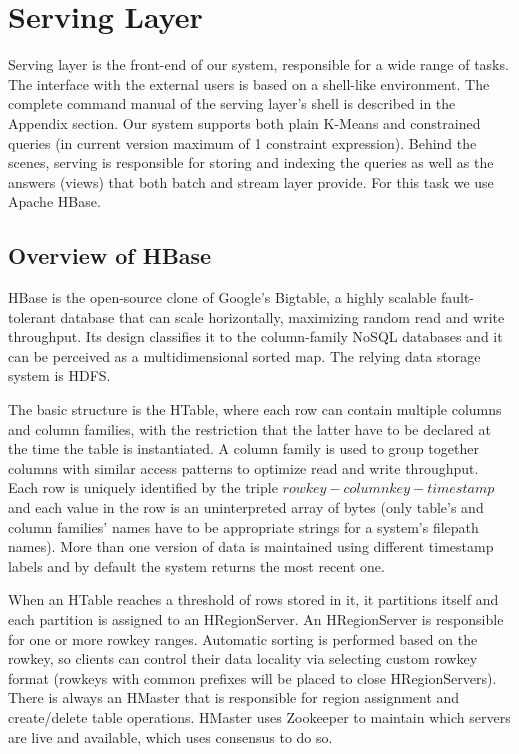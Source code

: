 \documentclass{lmproj}
\begin{document}
\section{Serving Layer}
\label{systemdescr}


Serving layer is the front-end of our system, responsible for a wide range of tasks. The interface with the external users is based on a shell-like environment. The complete command manual of the serving layer's shell is described in the Appendix section. Our system supports both plain K-Means and constrained queries (in current version maximum of 1 constraint expression). Behind the scenes, serving is responsible for storing and indexing the queries as well as the answers (views) that both batch and stream layer provide. For this task we use Apache HBase.

\subsection{Overview of HBase}
HBase is the open-source clone of Google's Bigtable, a highly scalable fault-tolerant database that can scale horizontally, maximizing random read and write throughput. Its design classifies it to the column-family NoSQL databases and it can be perceived as a multidimensional sorted map. The relying data storage system is HDFS.

The basic structure is the HTable, where each row can contain multiple columns and column families, with the restriction that the latter have to be declared at the time the table is instantiated. A column family is used to group together columns with similar access patterns to optimize read and write throughput. Each row is uniquely identified by the triple $row key-column key-timestamp$ and each value in the row is an uninterpreted array of bytes (only table's and column families' names have to be appropriate strings for a system's filepath names). More than one version of data is maintained using different timestamp labels and by default the system returns the most recent one.

When an HTable reaches a threshold of rows stored in it, it partitions itself and each partition is assigned to an HRegionServer. An HRegionServer is responsible for one or more rowkey ranges. Automatic sorting is performed based on the rowkey, so clients can control their data locality via selecting custom rowkey format (rowkeys with common prefixes will be placed to close HRegionServers). There is always an HMaster that is responsible for region assignment and create/delete table operations. HMaster uses Zookeeper to maintain which servers are live and available, which uses consensus to do so.
\end{document}
